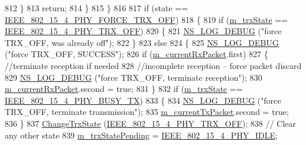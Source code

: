 \begin{DoxyCode}
812             \}
813           \textcolor{keywordflow}{return};
814         \}
815     \}
816 
817   \textcolor{keywordflow}{if} (state == \hyperlink{group__lr-wpan_gga6494269d13d45c511a07b7ccbb1de754a878a570a6caffa060865d60b3f92cc09}{IEEE\_802\_15\_4\_PHY\_FORCE\_TRX\_OFF})
818     \{
819       \textcolor{keywordflow}{if} (\hyperlink{classns3_1_1LrWpanPhy_a316704a4eb96e04f4b960ba3577fe0ce}{m\_trxState} == \hyperlink{group__lr-wpan_gga6494269d13d45c511a07b7ccbb1de754a4c0fd3882b68301deb8ce5b03109058f}{IEEE\_802\_15\_4\_PHY\_TRX\_OFF})
820         \{
821           \hyperlink{group__logging_ga413f1886406d49f59a6a0a89b77b4d0a}{NS\_LOG\_DEBUG} (\textcolor{stringliteral}{"force TRX\_OFF, was already off"});
822         \}
823       \textcolor{keywordflow}{else}
824         \{
825           \hyperlink{group__logging_ga413f1886406d49f59a6a0a89b77b4d0a}{NS\_LOG\_DEBUG} (\textcolor{stringliteral}{"force TRX\_OFF, SUCCESS"});
826           \textcolor{keywordflow}{if} (\hyperlink{classns3_1_1LrWpanPhy_a5e25bc6b183652edc17015d04cca92a3}{m\_currentRxPacket}.first)
827             \{   \textcolor{comment}{//terminate reception if needed}
828                 \textcolor{comment}{//incomplete reception -- force packet discard}
829               \hyperlink{group__logging_ga413f1886406d49f59a6a0a89b77b4d0a}{NS\_LOG\_DEBUG} (\textcolor{stringliteral}{"force TRX\_OFF, terminate reception"});
830               \hyperlink{classns3_1_1LrWpanPhy_a5e25bc6b183652edc17015d04cca92a3}{m\_currentRxPacket}.second = \textcolor{keyword}{true};
831             \}
832           \textcolor{keywordflow}{if} (\hyperlink{classns3_1_1LrWpanPhy_a316704a4eb96e04f4b960ba3577fe0ce}{m\_trxState} == \hyperlink{group__lr-wpan_gga6494269d13d45c511a07b7ccbb1de754a87f658959801356265b8c28a85569b15}{IEEE\_802\_15\_4\_PHY\_BUSY\_TX})
833             \{
834               \hyperlink{group__logging_ga413f1886406d49f59a6a0a89b77b4d0a}{NS\_LOG\_DEBUG} (\textcolor{stringliteral}{"force TRX\_OFF, terminate transmission"});
835               \hyperlink{classns3_1_1LrWpanPhy_a695601152abac951fa1958d826813082}{m\_currentTxPacket}.second = \textcolor{keyword}{true};
836             \}
837           \hyperlink{classns3_1_1LrWpanPhy_a149987679698c2878d941fac1238c41a}{ChangeTrxState} (\hyperlink{group__lr-wpan_gga6494269d13d45c511a07b7ccbb1de754a4c0fd3882b68301deb8ce5b03109058f}{IEEE\_802\_15\_4\_PHY\_TRX\_OFF});
838           \textcolor{comment}{// Clear any other state}
839           \hyperlink{classns3_1_1LrWpanPhy_a84647014f5242767e3358a6a851c81a7}{m\_trxStatePending} = \hyperlink{group__lr-wpan_gga6494269d13d45c511a07b7ccbb1de754af3994414efcd2fac7e312ecb9b3ebd70}{IEEE\_802\_15\_4\_PHY\_IDLE};

\end{DoxyCode}
